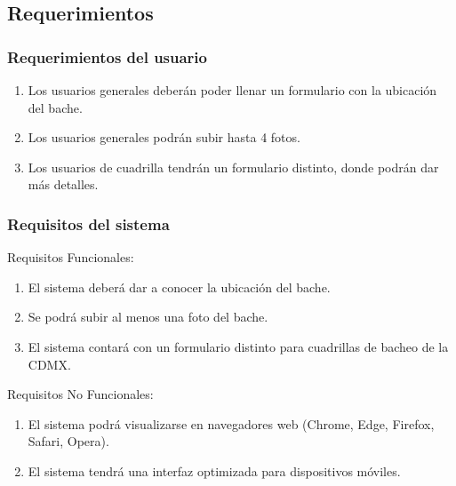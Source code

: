 \documentclass[letterpaper,11pt]{article}
\begin{document}
\subsection{Requerimientos}
\subsubsection{Requerimientos del usuario} 
\begin{enumerate}
    \item Los usuarios generales deberán poder llenar un formulario con la ubicación del bache.
    \item Los usuarios generales podrán subir hasta 4 fotos.
    \item Los usuarios de cuadrilla tendrán un formulario distinto, donde podrán dar más detalles.
\end{enumerate}
\subsubsection{Requisitos del sistema}
Requisitos Funcionales:
\begin{enumerate}
    \item El sistema deberá dar a conocer la ubicación del bache.
    \item Se podrá subir al menos una foto del bache.
    \item El sistema contará con un formulario distinto para cuadrillas de bacheo de la CDMX.
\end{enumerate}

Requisitos No Funcionales:
\begin{enumerate}
    \item El sistema podrá visualizarse en navegadores web (Chrome, Edge, Firefox, Safari, Opera).
    \item El sistema tendrá una interfaz optimizada para dispositivos móviles.
\end{enumerate}
\end{document}
